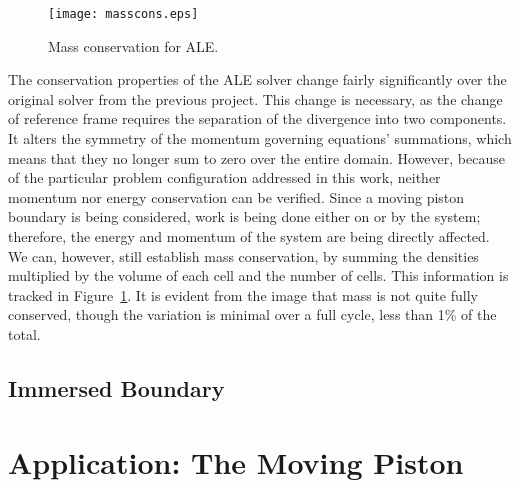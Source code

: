 \documentclass{article}
\begin{document}
\begin{figure}
    \centering
    \texttt{[image: masscons.eps]}         
    \caption{Mass conservation for ALE.}
    \label{fig:masscons}
  \end{figure}
The conservation properties of the ALE solver change fairly significantly over the original solver from the previous project.  This change is necessary, as the change of reference frame requires the separation of the divergence into two components.  It alters the symmetry of the momentum governing equations' summations, which means that they no longer sum to zero over the entire domain.  However, because of the particular problem configuration addressed in this work, neither momentum nor energy conservation can be verified.  Since a moving piston boundary is being considered, work is being done either on or by the system; therefore, the energy and momentum of the system are being directly affected.  We can, however, still establish mass conservation, by summing the densities multiplied by the volume of each cell and the number of cells.  This information is tracked in Figure~\ref{fig:masscons}.  It is evident from the image that mass is not quite fully conserved, though the variation is minimal over a full cycle, less than 1\% of the total.  

\subsection{Immersed Boundary}



\section{Application: The Moving Piston}
\end{document}
